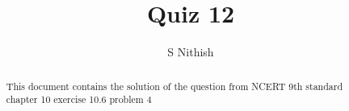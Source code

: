 \documentclass[journal,12pt,twocolumn]{IEEEtran}
\begin{document}
\let\StandardTheFigure\thefigure
\let\vec\mathbf
\renewcommand{\thefigure}{\theproblem}



\def\putbox#1#2#3{\makebox[0in][l]{\makebox[#1][l]{}\raisebox{\baselineskip}[0in][0in]{\raisebox{#2}[0in][0in]{#3}}}}
     \def\rightbox#1{\makebox[0in][r]{#1}}
     \def\centbox#1{\makebox[0in]{#1}}
     \def\topbox#1{\raisebox{-\baselineskip}[0in][0in]{#1}}
     \def\midbox#1{\raisebox{-0.5\baselineskip}[0in][0in]{#1}}

\vspace{3cm}


\title{Quiz 12}
\author{S Nithish}
\maketitle

\newpage


\bigskip

\renewcommand{\thefigure}{\theenumi}
\renewcommand{\thetable}{\theenumi}


\begin{abstract}
This document contains the solution of the question from NCERT 9th standard chapter 10 exercise 10.6 problem 4
\end{abstract}

%

%
%
\end{document}
